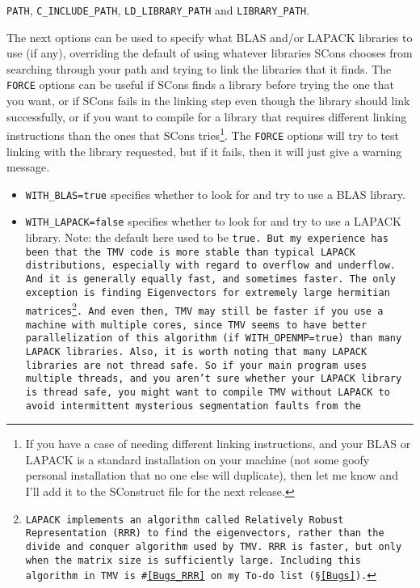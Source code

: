 \begin{enumerate}
\begin{itemize}
\texttt{PATH}, \texttt{C\_INCLUDE\_PATH}, \texttt{LD\_LIBRARY\_PATH} and \texttt{LIBRARY\_PATH}.
\end{itemize}
The next options can be used to specify what BLAS and/or LAPACK libraries to use (if any),
overriding the default of using whatever libraries SCons chooses from searching through your path
and trying to link the libraries that it finds.  The \texttt{FORCE} options can be useful if SCons finds
a library before trying the one that you want, or if SCons fails in the linking step even though
the library should link successfully, or if
you want to compile for a library that requires different linking instructions than the 
ones that SCons tries\footnote{
If you have a case of needing different linking instructions, and your BLAS or LAPACK is a standard
installation on your machine (not some goofy personal installation that no one else will duplicate),
then let me know and I'll add it to the SConstruct file for the next release.}.
The \texttt{FORCE} options will try to test linking with the library requested,
but if it fails, then it will just give a warning message.
\begin{itemize}
\item \texttt{WITH\_BLAS=true} specifies whether to look for and try to use a BLAS library.
\item \texttt{WITH\_LAPACK=false} specifies whether to look for and try to use a LAPACK library.
Note: the default here used to be \tt{true}.  But my experience has been that the TMV code
is more stable than typical LAPACK distributions, especially with regard to overflow and 
underflow.  And it is generally equally fast, and sometimes faster.  The only exception is 
finding Eigenvectors for extremely large hermitian matrices\footnote{
LAPACK implements an algorithm called Relatively Robust Representation (RRR) to 
find the eigenvectors, rather than the divide and conquer algorithm used by TMV.
RRR is faster, but only when the matrix size is sufficiently large.  Including this algorithm 
in TMV is \#\ref{Bugs_RRR} on my To-do list (\S\ref{Bugs}).
}.  And even then, TMV may still be faster 
if you use a machine with multiple 
cores, since TMV seems to have better parallelization of this algorithm
 (if \tt{WITH_OPENMP=true}) than many LAPACK libraries.
Also, it is worth noting that many LAPACK libraries are not thread safe.
So if your main program uses multiple threads, and you aren't sure whether
your LAPACK library is thread safe, you might want to compile TMV without 
LAPACK to avoid intermittent mysterious segmentation faults from the

\end{itemize}
\end{enumerate}
